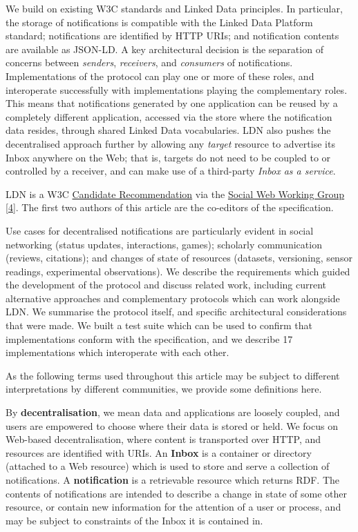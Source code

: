 \documentclass[]{article}
\begin{document}
We build on existing W3C standards and Linked Data principles. In
particular, the storage of notifications is compatible with the Linked
Data Platform standard; notifications are identified by HTTP URIs; and
notification contents are available as JSON-LD. A key architectural
decision is the separation of concerns between \emph{senders},
\emph{receivers}, and \emph{consumers} of notifications. Implementations
of the protocol can play one or more of these roles, and interoperate
successfully with implementations playing the complementary roles. This
means that notifications generated by one application can be reused by a
completely different application, accessed via the store where the
notification data resides, through shared Linked Data vocabularies. LDN
also pushes the decentralised approach further by allowing any
\emph{target} resource to advertise its Inbox anywhere on the Web; that
is, targets do not need to be coupled to or controlled by a receiver,
and can make use of a third-party \emph{Inbox as a service}.{}

LDN is a W3C \href{https://www.w3.org/TR/ldn/}{Candidate Recommendation}
via the \href{https://www.w3.org/wiki/Socialwg}{Social Web Working
Group} {[}\protect\hyperlink{ref-4}{4}{]}. The first two authors of this
article are the co-editors of the specification.

Use cases for decentralised notifications are particularly evident in
social networking (status updates, interactions, games); scholarly
communication (reviews, citations); and changes of state of resources
(datasets, versioning, sensor readings, experimental observations). We
describe the requirements which guided the development of the protocol
and discuss related work, including current alternative approaches and
complementary protocols which can work alongside LDN. We summarise the
protocol itself, and specific architectural considerations that were
made. We built a test suite which can be used to confirm that
implementations conform with the specification, and we describe 17
implementations which interoperate with each other.

\hypertarget{concept-scheme}{}
{As the following terms used throughout this article may be subject to
different interpretations by different communities, we provide some
definitions here.}

By \textbf{decentralisation}, we mean {data and applications are loosely
coupled, and users are empowered to choose where their data is stored or
held. We focus on Web-based decentralisation, where content is
transported over HTTP, and resources are identified with URIs.} An
\textbf{Inbox} is {a container or directory (attached to a Web resource)
which is used to store and serve a collection of notifications.} A
\textbf{notification} is {a retrievable resource which returns RDF. The
contents of notifications are intended to describe a change in state of
some other resource, or contain new information for the attention of a
user or process, and may be subject to constraints of the Inbox it is
contained in.}
\end{document}
